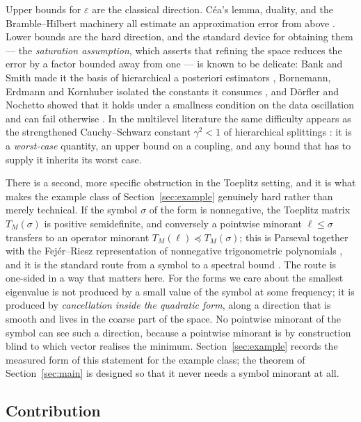 \documentclass[11pt,a4paper]{article}
\theoremstyle{plain}
\theoremstyle{definition}
\newcommand{\Tm}[1]{T_{#1}}
\begin{document}
Upper bounds for $\varepsilon$ are the classical direction. C\'ea's lemma, duality,
and the Bramble--Hilbert machinery all estimate an approximation error from above
\cite{Cea1964}. Lower bounds are the hard direction, and the standard device for
obtaining them --- the \emph{saturation assumption}, which asserts that refining the
space reduces the error by a factor bounded away from one --- is known to be delicate:
Bank and Smith made it the basis of hierarchical a posteriori estimators
\cite{BankSmith1993}, Bornemann, Erdmann and Kornhuber isolated the constants it
consumes \cite{BornemannErdmannKornhuber1996}, and D\"orfler and Nochetto showed that
it holds under a smallness condition on the data oscillation and can fail otherwise
\cite{DorflerNochetto2002}. In the multilevel literature the same difficulty appears
as the strengthened Cauchy--Schwarz constant $\gamma^{2}<1$ of hierarchical
splittings \cite{Yserentant1986,BPX1990,AxelssonVassilevski1989,Brandt1977}: it is a
\emph{worst-case} quantity, an upper bound on a coupling, and any bound that has to
supply it inherits its worst case.

There is a second, more specific obstruction in the Toeplitz setting, and it is what
makes the example class of Section~\ref{sec:example} genuinely hard rather than
merely technical. If the symbol $\sigma$ of the form is nonnegative, the Toeplitz
matrix $\Tm{M}(\sigma)$ is positive semidefinite, and conversely a pointwise minorant
$\ell\le\sigma$ transfers to an operator minorant $\Tm{M}(\ell)\preceq\Tm{M}(\sigma)$;
this is Parseval together with the Fej\'er--Riesz representation of nonnegative
trigonometric polynomials \cite{Fejer1916,Riesz1916}, and it is the standard route
from a symbol to a spectral bound \cite{KMS1953,GrenanderSzego1958}. The route is
one-sided in a way that matters here. For the forms we care about the smallest
eigenvalue is not produced by a small value of the symbol at some frequency; it is
produced by \emph{cancellation inside the quadratic form}, along a direction that is
smooth and lives in the coarse part of the space. No pointwise minorant of the symbol
can see such a direction, because a pointwise minorant is by construction blind to
which vector realises the minimum. Section~\ref{sec:example} records the measured
form of this statement for the example class; the theorem of
Section~\ref{sec:main} is designed so that it never needs a symbol minorant at all.

\subsection{Contribution}
\end{document}
